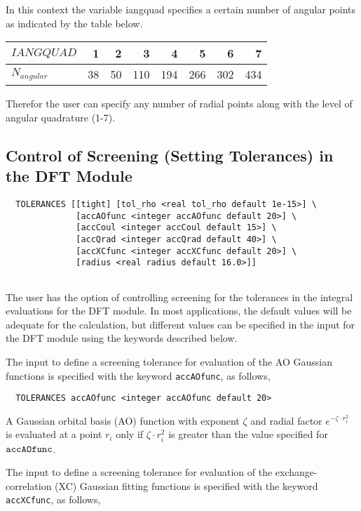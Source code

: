 In this context the variable iangquad specifies a certain number of
angular points as indicated by the table below.


  \begin{tabular}[right]{|l|r r r r r r r|} \hline
$IANGQUAD$ & 1 & 2 & 3 & 4 & 5 & 6 & 7 \\ \hline
$N_{angular}$ & 38 & 50 & 110 & 194 & 266 & 302 & 434 \\  \hline
  \end{tabular}

Therefor the user can specify any number of radial points along with
the level of angular quadrature (1-7).

\subsection{Control of Screening (Setting Tolerances) in the DFT Module}
\begin{verbatim}
  TOLERANCES [[tight] [tol_rho <real tol_rho default 1e-15>] \
              [accAOfunc <integer accAOfunc default 20>] \
              [accCoul <integer accCoul default 15>] \
              [accQrad <integer accQrad default 40>] \
              [accXCfunc <integer accXCfunc default 20>] \
              [radius <real radius default 16.0>]]


\end{verbatim}


The user has the option of controlling screening for the tolerances in
the integral evaluations for the DFT module.  In most applications, the
default values will be adequate for the calculation, but different values
can be specified in the input for the DFT module using the keywords
described below.

The input to define a screening tolerance for evaluation of the AO 
Gaussian functions is specified with the keyword \verb+accAOfunc+, as
follows,

\begin{verbatim}
  TOLERANCES accAOfunc <integer accAOfunc default 20>
\end{verbatim}

A Gaussian orbital basis (AO) function with exponent $\zeta$
and radial factor $e^{-\zeta\cdot r_i^2}$ is 
evaluated  at a point $r_i$ only if 
$\zeta\cdot r_i^2$ is greater than the value specified for ${\tt accAOfunc}$.

The input to define a screening tolerance for evaluation of the exchange-
correlation (XC) Gaussian fitting functions is specified with the
keyword \verb+accXCfunc+, as follows,
 
